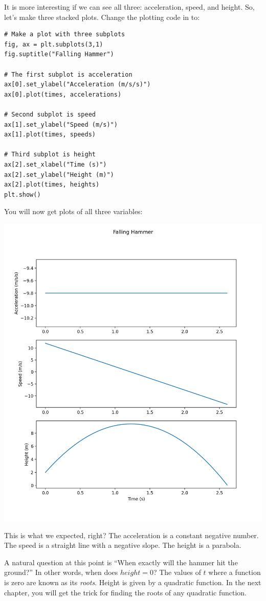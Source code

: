 It is more interesting if we can see all three: acceleration, speed, and height. 
So, let's make three stacked plots. Change the plotting code in  to:

\begin{Verbatim}
# Make a plot with three subplots
fig, ax = plt.subplots(3,1)
fig.suptitle("Falling Hammer")

# The first subplot is acceleration
ax[0].set_ylabel("Acceleration (m/s/s)")
ax[0].plot(times, accelerations)

# Second subplot is speed
ax[1].set_ylabel("Speed (m/s)")
ax[1].plot(times, speeds)

# Third subplot is height
ax[2].set_xlabel("Time (s)")
ax[2].set_ylabel("Height (m)")
ax[2].plot(times, heights)
plt.show()
\end{Verbatim}

You will now get plots of all three variables:

\includegraphics[width=0.8\linewidth]{stackedplot.png}

This is what we expected, right?  The acceleration is a constant negative number.  The speed is a
straight line with a negative slope.  The height is a parabola.

A natural question at this point is ``When exactly will the hammer hit the
ground?''  In other words, when does $height = 0$? The values of $t$ where a function is zero are
known as its \textit{roots}. Height is given by a quadratic function. In the next
chapter, you will get the trick for finding the roots of any quadratic
function.
